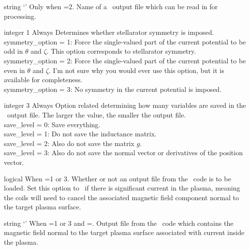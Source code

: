 \myhrule

{string}
{`'}
{Only when =2.}
{Name of a \nescoil~output file which can be read in for processing.
}

\myhrule

{integer}
{1}
{Always}
{Determines whether stellarator symmetry is imposed.\\

{\ttfamily symmetry\_option} = 1: Force the single-valued part of the current potential
to be odd in $\theta$ and $\zeta$. This option corresponds to stellarator symmetry.\\

{\ttfamily symmetry\_option} = 2: Force the single-valued part of the current potential
to be even in $\theta$ and $\zeta$. I'm not sure why you would ever use this option,
but it is available for completeness.\\

{\ttfamily symmetry\_option} = 3: No symmetry in the current potential is imposed.
}

\myhrule

{integer}
{3}
{Always}
{Option related determining how many variables are saved in the \netCDF~output file.  The larger the value, the smaller the output file.\\

{\ttfamily save\_level} = 0: Save everything.\\

{\ttfamily save\_level} = 1: Do not save the inductance matrix.\\

{\ttfamily save\_level} = 2: Also do not save the matrix $g$.\\

{\ttfamily save\_level} = 3: Also do not save the normal vector or derivatives of the position vector.
}

\myhrule

{logical}
{\false}
{When =1 or 3.}
{Whether or not an output file from the \bnorm~code is to be loaded.
Set this option to \true~if there is significant current in the plasma,
meaning the coils will need to cancel the associated magnetic field component normal
to the target plasma surface.
}

\myhrule

{string}
{`'}
{When =1 or 3 and =\true.}
{Output file from the \bnorm~code which contains the magnetic field normal to the target
plasma surface associated with current inside the plasma.}


